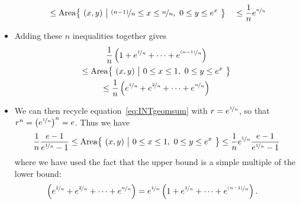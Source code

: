 \begin{itemize}
\begin{alignat*}{3}
&\le {\rm Area}\big\{\ (x,y)\ \big|\
          \nicefrac{(n-1)}{n}\le x\le \nicefrac{n}{n},\ 0\le y\le e^x\ \big\}
&\ \le\frac{1}{n}e^{\nicefrac{n}{n}}
\end{alignat*}
\item
Adding these $n$ inequalities together gives
\begin{multline*}
\frac{1}{n}\left(1+e^{\nicefrac{1}{n}}+\cdots+e^{\nicefrac{(n-1)}{n}}\right)\\
\le {\rm Area}\big\{\ (x,y)\ \big|\ 0\le x\le 1,\ 0\le y\le e^x\ \big\}\\
\le \frac{1}{n}\left(e^{\nicefrac{1}{n}}+e^{\nicefrac{2}{n}}+\cdots+
         e^{\nicefrac{n}{n}}\right)
\end{multline*}

\item We can then recycle equation~\eqref{eq:INTgeomsum} with $r=e^{\nicefrac1n}$, so
that $r^n=\left(e^{\nicefrac{1}{n}}\right)^n=e$. Thus we have
\begin{align*}
\frac{1}{n}\frac{e-1}{e^{\nicefrac{1}{n}}-1}
\le {\rm Area}\big\{\ (x,y)\ \big|\ 0\le x\le 1,\ 0\le y\le e^x\ \big\}
\le \frac{1}{n}e^{\nicefrac{1}{n}}\frac{e-1}{e^{\nicefrac{1}{n}}-1}
\end{align*}
where we have used the fact that the upper bound is a simple multiple of the
lower bound:
\begin{align*}
\left(e^{\nicefrac{1}{n}}+e^{\nicefrac{2}{n}}+\cdots+
         e^{\nicefrac{n}{n}}\right)
&= e^{\nicefrac{1}{n}}\left(1+e^{\nicefrac{1}{n}}+\cdots
+e^{\nicefrac{(n-1)}{n}}\right).
\end{align*}


\end{itemize}
